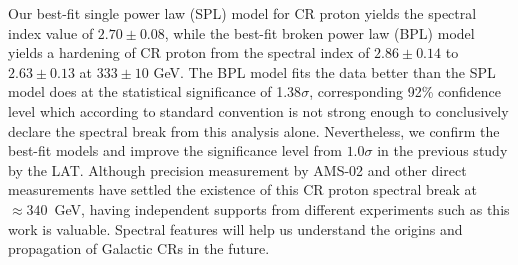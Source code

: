Our best-fit single power law (SPL) model for CR proton yields
the spectral index value of $2.70\pm 0.08$, while the
best-fit broken power law (BPL) model yields a hardening of
CR proton from the spectral index of $2.86\pm 0.14$ to $2.63\pm 0.13$
at $333\pm 10$ GeV. The BPL model fits the data better than
the SPL model does at the statistical significance of 1.38$\sigma$,
corresponding 92\% confidence level which according to
standard convention is not strong enough to conclusively declare
the spectral break from this analysis alone.
Nevertheless, we confirm the best-fit models and improve
the significance level from $1.0\sigma$ in the previous study by the LAT.
Although precision measurement by AMS-02 and other
direct measurements have settled the existence of
this CR proton spectral break at $\approx340$~GeV,
having independent supports from different experiments
such as this work is valuable. Spectral features will help us
understand the origins and propagation of Galactic CRs in the future.


